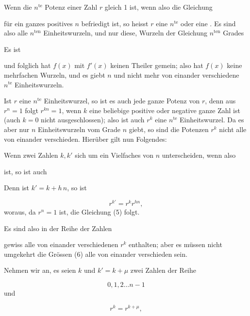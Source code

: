 Wenn die $n^{\mathrm{te}}$ Potenz einer Zahl $r$ gleich 1 ist, wenn also die Gleichung

für ein ganzes positives $n$ befriedigt ist, so heisst $r$ eine $n^{\mathrm{te}}$
 oder eine . Es sind also alle $n^{\mathrm{ten}}$
Einheitswurzeln, und nur diese, Wurzeln der Gleichung $n^{\mathrm{ten}}$ Grades

Es ist

und folglich hat $f(x)$ mit $f'(x)$ keinen Theiler gemein; also hat $f(x)$ keine
mehrfachen Wurzeln, und es giebt $n$ und nicht mehr von einander verschiedene
$n^{\mathrm{te}}$ Einheitswurzeln.

Ist $r$ eine $n^{\mathrm{te}}$ Einheitswurzel, so ist es auch jede ganze Potenz von $r$,
denn aus $r^n = 1$ folgt $r^{kn} = 1$, wenn $k$ eine beliebige positive oder negative
ganze Zahl ist (auch $k = 0$ nicht ausgeschlossen); also ist auch $r^k$ eine $n^{\mathrm{te}}$
Einheitswurzel. Da es aber nur $n$ Einheitswurzeln vom Grade $n$ giebt, so sind die
Potenzen $r^k$ nicht alle von einander verschieden. Hierüber gilt nun Folgendes:

Wenn zwei Zahlen $k, k'$ sich um ein Vielfaches von $n$ unterscheiden, wenn also

ist, so ist auch

Denn ist $k' = k + h\,n$, so ist

\[
r^{k'} = r^k r^{h n},
\]
woraus, da $r^n = 1$ ist, die Gleichung (5) folgt.

Es sind also in der Reihe der Zahlen

gewiss alle von einander verschiedenen $r^k$ enthalten; aber es müssen nicht umgekehrt
die Gr\"ossen (6) alle von einander verschieden sein.

Nehmen wir an, es seien $k$ und $k' = k + \mu$ zwei Zahlen der Reihe

\[
0, 1, 2 \ldots n-1
\]
und

\[
r^k = r^{k+\mu},
\]
